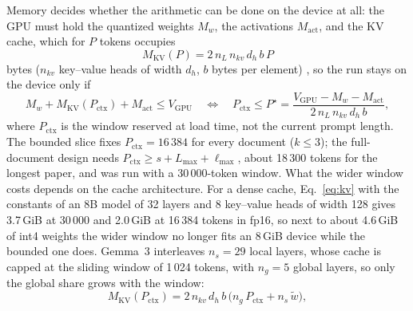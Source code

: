 \documentclass[pdflatex,sn-mathphys-num]{sn-jnl}
\newif\ifprovenance
\newcommand{\verify}[1]{\ifprovenance\textcolor{red}{{\footnotesize [VERIFY: #1]}}\fi}
\theoremstyle{thmstyleone}%
\theoremstyle{thmstylethree}%
\begin{document}
Memory decides whether the arithmetic can be done on the device at all: the GPU must hold the quantized weights $M_w$, the activations $M_{\mathrm{act}}$, and the KV cache, which for $P$ tokens occupies
\begin{equation}\label{eq:kv}
M_{\mathrm{KV}}(P)=2\,n_L\,n_{kv}\,d_h\,b\,P
\end{equation}
bytes ($n_{kv}$ key--value heads of width $d_h$, $b$ bytes per element) \cite{pope2023efficiently,ainslie2023gqa}, so the run stays on the device only if
\begin{equation}\label{eq:vram}
M_w+M_{\mathrm{KV}}(P_{\mathrm{ctx}})+M_{\mathrm{act}}\le V_{\mathrm{GPU}}
\quad\Longleftrightarrow\quad
P_{\mathrm{ctx}}\le P^{\star}=\frac{V_{\mathrm{GPU}}-M_w-M_{\mathrm{act}}}{2\,n_L\,n_{kv}\,d_h\,b},
\end{equation}
where $P_{\mathrm{ctx}}$ is the window reserved at load time, not the current prompt length. The bounded slice fixes $P_{\mathrm{ctx}}=16\,384$ for every document ($k\le3$); the full-document design needs $P_{\mathrm{ctx}}\ge s+L_{\max}+\ell_{\max}$, about 18\,300 tokens for the longest paper, and was run with a 30\,000-token window\verify{longest document 76\,161 characters (sum of chunk lengths of \texttt{s41586-019-1138-y.pdf.json} in \texttt{RnD/split\_documents/}), divided by 4.17 characters per token; windows from \texttt{RnD/Models/chunker\_anthropic.Modelfile} (30000) and \texttt{chunker\_full\_doc.Modelfile} (16384)}. What the wider window costs depends on the cache architecture. For a dense cache, Eq.~\eqref{eq:kv} with the constants of an 8B model of 32 layers and 8 key--value heads of width 128 gives 3.7\,GiB at 30\,000 and 2.0\,GiB at 16\,384 tokens in fp16, so next to about 4.6\,GiB of int4 weights the wider window no longer fits an 8\,GiB device while the bounded one does. Gemma~3 interleaves $n_s=29$ local layers, whose cache is capped at the sliding window of 1\,024 tokens, with $n_g=5$ global layers, so only the global share grows with the window:
\begin{equation}\label{eq:kv-iswa}
M_{\mathrm{KV}}(P_{\mathrm{ctx}})=2\,n_{kv}\,d_h\,b\,\bigl(n_g\,P_{\mathrm{ctx}}+n_s\,\tilde w\bigr),
\end{equation}
\end{document}
